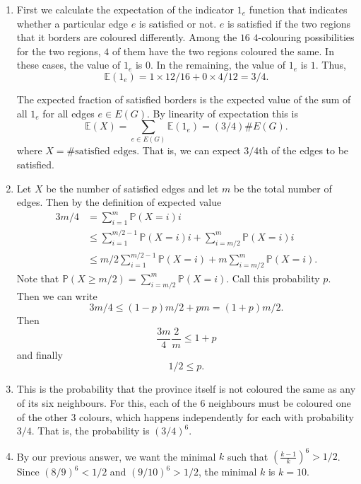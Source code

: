 \documentclass[12 pt, letterpaper]{hmcpset}
\begin{document}
\begin{solution}
	\begin{enumerate}
		\item First we calculate the expectation of the indicator $1_{e}$ function that indicates whether a particular edge $e$ is satisfied or not. $e$ is satisfied if the two regions that it borders are coloured differently. Among the $16$ $4$-colouring possibilities for the two regions, $4$ of them have the two regions coloured the same. In these cases, the value of $1_{e}$ is $0$. In the remaining, the value of $1_{e}$ is $1$. Thus,
			\[
				\mathbb{E}(1_{e}) = 1 \times 12 / 16 + 0 \times 4 / 12 = 3/4.
			\]

			The expected fraction of satisfied borders is the expected value of the sum of all $1_{e}$ for all edges $e \in E(G)$. By linearity of expectation this is
			\[
				\mathbb{E}(X) = \sum_{e \in E(G)} \mathbb{E}(1_{e}) = (3 / 4) \# E(G).
			\]
			where $X = \#\text{satisfied edges}$. That is, we can expect $3 / 4$th of the edges to be satisfied.

		\item Let $X$ be the number of satisfied edges and let $m$ be the total number of edges. Then by the definition of expected value
			\begin{align*}
				3m/4 & = \sum_{i = 1}^{m} \mathbb{P}(X = i) i \\
				     & \le \sum_{i = 1}^{m / 2 - 1} \mathbb{P}(X = i) i + \sum_{i = m / 2}^{m} \mathbb{P}(X = i) i \\
				     & \le m/2 \sum_{i = 1}^{m / 2 - 1} \mathbb{P}(X = i) + m \sum_{i = m / 2}^{m} \mathbb{P}(X = i).
			\end{align*}
			Note that $\mathbb{P}(X \ge m / 2) = \sum_{i = m / 2}^{m} \mathbb{P}(X = i)$. Call this probability $p$. Then we can write
			\[
				3m / 4 \le (1 - p) m / 2 + pm = (1 + p)m/2.
			\]
			Then
			\[
				\frac{3m}{4} \frac{2}{m} \le 1 + p
			\]
			and finally
			\[
				1 / 2 \le p.
			\]

		\item This is the probability that the province itself is not coloured the same as any of its six neighbours. For this, each of the $6$ neighbours must be coloured one of the other $3$ colours, which happens independently for each with probability $3 / 4$. That is, the probability is $(3 / 4)^{6}$.

		\item By our previous answer, we want the minimal $k$ such that $(\frac{k - 1}{k})^{6} > 1/ 2$. Since $(8 / 9)^{6} < 1/2$ and $(9 / 10)^{6} > 1/2$, the minimal $k$ is $k = 10$.


\end{enumerate}
\end{solution}
\end{document}

